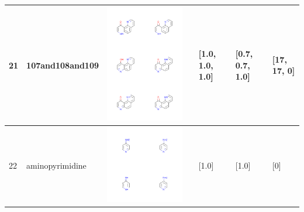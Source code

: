 \begin{longtable}{|l|l|l|l|l|l|l|}
\hline
21 & 107and108and109 & \includegraphics[scale=0.6]{107and108and109CA.png} & & [1.0, 1.0, 1.0]& [0.7, 0.7, 1.0] & [17, 17, 0] \\
\hline
22 & aminopyrimidine & \includegraphics[scale=0.6]{aminopyrimidineCA.png} & & [1.0]& [1.0] & [0] \\

\end{longtable}
